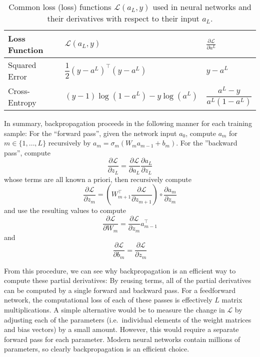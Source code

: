 \begin{table}
\begin{center}
\begin{tabular}{lll}
  \toprule
  Loss Function & $\mathcal{L}(a_L, y)$                           & $\frac{\partial \mathcal{L}}{\partial a^L}$ \\
  \midrule
  Squared Error & $\dfrac{1}{2}(y - a^L)^\top(y - a^L)$ & $y - a^L$                         \\
  Cross-Entropy & $(y - 1)\log(1 - a^L) - y\log(a^L)$   & $\dfrac{a^L - y}{a^L(1 - a^L)}$   \\
  \bottomrule
\end{tabular}
\end{center}
\caption[Common loss functions used in neural networks]{Common loss (loss) functions $\mathcal{L}(a_L, y)$ used in neural networks and their derivatives with respect to their input $a_L$.}
  \label{tab:loss_functions}
\end{table}

In summary, backpropagation proceeds in the following manner for each training sample: For the ``forward pass'', given the network input $a_0$, compute $a_m$ for $m \in \{1, \ldots, L\}$ recursively by $a_m = \sigma_m(W_m a_{m - 1} + b_m)$.
For the ''backward pass'', compute
\begin{equation}
\frac{\partial \mathcal{L}}{\partial z_L} = \frac{\partial \mathcal{L}}{\partial a_L} \frac{\partial a_L}{\partial z_L}
\end{equation}
whose terms are all known a priori, then recursively compute
\begin{equation}
        \frac{\partial \mathcal{L}}{\partial z_m} = \left(W_{m + 1}^\top \frac{\partial \mathcal{L}}{\partial z_{m + 1}}\right) \circ \frac{\partial a_m}{\partial z_m}
\end{equation}
and use the resulting values to compute
\begin{equation}
        \frac{\partial \mathcal{L}}{\partial W_m} = \frac{\partial \mathcal{L}}{\partial z_m} a_{m - 1}^\top
\end{equation}
and
\begin{equation}
        \frac{\partial \mathcal{L}}{\partial b_m} = \frac{\partial \mathcal{L}}{\partial z_m}
\end{equation}

From this procedure, we can see why backpropagation is an efficient way to compute these partial derivatives: By reusing terms, all of the partial derivatives can be computed by a single forward and backward pass.
For a feedforward network, the computational loss of each of these passes is effectively $L$ matrix multiplications.
A simple alternative would be to measure the change in $\mathcal{L}$ by adjusting each of the parameters (i.e.\ individual elements of the weight matrices and bias vectors) by a small amount.
However, this would require a separate forward pass for each parameter.
Modern neural networks contain millions of parameters, so clearly backpropagation is an efficient choice.

